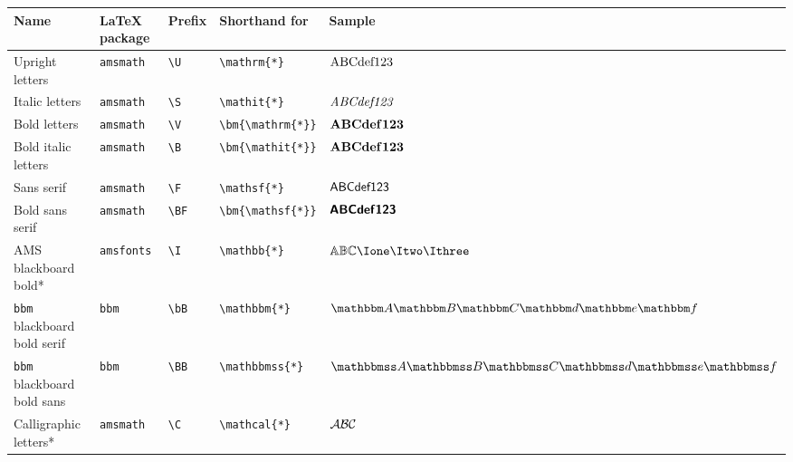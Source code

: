 \documentclass[]{article}
\begin{document}
\begin{table}[htbp]
  \hspace{-1.8cm}
  \begin{tabular}{p{14em} l l l l}
    \toprule
    Name & \LaTeX{} package & Prefix & Shorthand for & Sample \\
    \midrule
    Upright letters & \texttt{amsmath} & \verb+\U+ & \verb+\mathrm{*}+ & $\mathrm{A}\mathrm{B}\mathrm{C}\mathrm{d}\mathrm{e}\mathrm{f}\mathrm{1}\mathrm{2}\mathrm{3}$\\
    Italic letters & \texttt{amsmath} & \verb+\S+ & \verb+\mathit{*}+ & $\mathit{A}\mathit{B}\mathit{C}\mathit{d}\mathit{e}\mathit{f}\mathit{1}\mathit{2}\mathit{3}$ \\
    Bold letters & \texttt{amsmath} & \verb+\V+ & \verb+\bm{\mathrm{*}}+ & $\bm{\mathrm{A}}\bm{\mathrm{B}}\bm{\mathrm{C}}\bm{\mathrm{d}}\bm{\mathrm{e}}\bm{\mathrm{f}}\bm{\mathrm{1}}\bm{\mathrm{2}}\bm{\mathrm{3}}$ \\
    Bold italic letters & \texttt{amsmath} & \verb+\B+ & \verb+\bm{\mathit{*}}+ & $\bm{\mathrm{A}}\bm{\mathrm{B}}\bm{\mathrm{C}}\bm{\mathrm{d}}\bm{\mathrm{e}}\bm{\mathrm{f}}\bm{\mathrm{1}}\bm{\mathrm{2}}\bm{\mathrm{3}}$ \\
    Sans serif & \texttt{amsmath} & \verb+\F+ & \verb+\mathsf{*}+ & $\mathsf{A}\mathsf{B}\mathsf{C}\mathsf{d}\mathsf{e}\mathsf{f}\mathsf{1}\mathsf{2}\mathsf{3}$\\
    Bold sans serif & \texttt{amsmath} & \verb+\BF+ & \verb+\bm{\mathsf{*}}+ & $\bm{\mathsf{A}}\bm{\mathsf{B}}\bm{\mathsf{C}}\bm{\mathsf{d}}\bm{\mathsf{e}}\bm{\mathsf{f}}\bm{\mathsf{1}}\bm{\mathsf{2}}\bm{\mathsf{3}}$\\
    AMS blackboard bold* & \texttt{amsfonts} & \verb+\I+ & \verb+\mathbb{*}+ & $\IA\IB\IC\Ione\Itwo\Ithree$ \\
    \texttt{bbm} blackboard bold serif & \texttt{bbm} & \verb+\bB+ & \verb+\mathbbm{*}+ & $\bBA\bBB\bBC\bBd\bBe\bBf$\\
    \texttt{bbm} blackboard bold sans & \texttt{bbm} & \verb+\BB+ & \verb+\mathbbmss{*}+ & $\BBA\BBB\BBC\BBd\BBe\BBf$ \\
    Calligraphic letters* & \texttt{amsmath} & \verb+\C+ & \verb+\mathcal{*}+ & $\mathcal{A}\mathcal{B}\mathcal{C}$ \\

\end{tabular}
\end{table}
\end{document}
